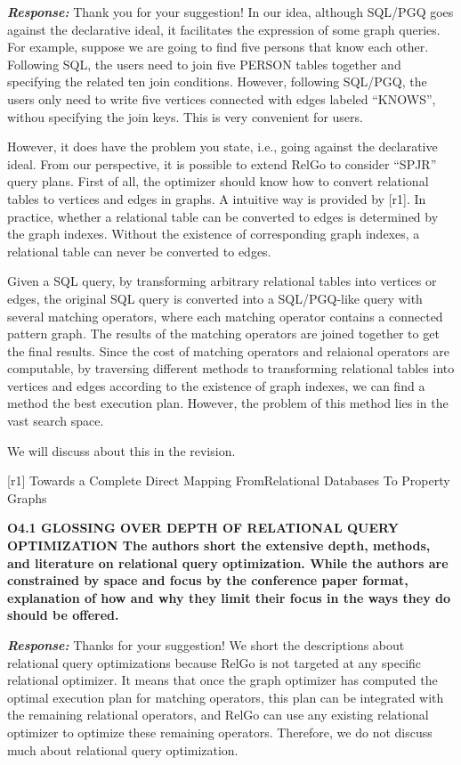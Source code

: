 \textbf{\textit{Response: }}
Thank you for your suggestion! 
In our idea, although SQL/PGQ goes against the declarative ideal, it facilitates the expression of some graph queries.
For example, suppose we are going to find five persons that know each other.
Following SQL, the users need to join five PERSON tables together and specifying the related ten join conditions.
However, following SQL/PGQ, the users only need to write five vertices connected with edges labeled ``KNOWS'', withou specifying the join keys.
This is very convenient for users.

However, it does have the problem you state, i.e., going against the declarative ideal.
From our perspective, it is possible to extend RelGo to consider ``SPJR'' query plans.
First of all, the optimizer should know how to convert relational tables to vertices and edges in graphs.
A intuitive way is provided by [r1].
In practice, whether a relational table can be converted to edges is determined by the graph indexes.
Without the existence of corresponding graph indexes, a relational table can never be converted to edges.

Given a SQL query, by transforming arbitrary relational tables into vertices or edges, the original SQL query is converted into a SQL/PGQ-like query with several matching operators, where each matching operator contains a connected pattern graph.
The results of the matching operators are joined together to get the final results.
Since the cost of matching operators and relaional operators are computable, by traversing different methods to transforming relational tables into vertices and edges according to the existence of graph indexes, we can find a method the best execution plan.
However, the problem of this method lies in the vast search space.

We will discuss about this in the revision.

[r1] Towards a Complete Direct Mapping FromRelational Databases To Property Graphs

\textbf{O4.1 GLOSSING OVER DEPTH OF RELATIONAL QUERY OPTIMIZATION
The authors short the extensive depth, methods, and literature on relational query optimization. While the authors are constrained by space and focus by the conference paper format, explanation of how and why they limit their focus in the ways they do should be offered. }

\textbf{\textit{Response: }}
Thanks for your suggestion! 
We short the descriptions about relational query optimizations because RelGo is not targeted at any specific relational optimizer.
It means that once the graph optimizer has computed the optimal execution plan for matching operators, this plan can be integrated with the remaining relational operators, and RelGo can use any existing relational optimizer to optimize these remaining operators.
Therefore, we do not discuss much about relational query optimization.

